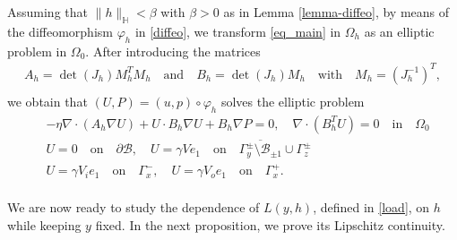 \documentclass[11pt,a4paper]{amsart}
\theoremstyle{remark}
\theoremstyle{definition}
\numberwithin{equation}{section}
\numberwithin{proposition}{section}
\begin{document}
Assuming that $\|h\|_{\mathbb{H}}< \beta$ with $\beta>0$ as in Lemma \ref{lemma-diffeo}, by means of the diffeomorphism $\varphi_h$ in \eqref{diffeo}, we transform \eqref{eq_main} in $\Omega_h$ as an elliptic problem in $\Omega_0$. After
introducing the matrices
\begin{equation}\label{matrices-diffeo}
\begin{aligned}
    A_h= \det(J_h) M_h^TM_h \quad \text{and} \quad B_h= \det(J_h) M_h \quad \text{with} \quad  M_h = (J_h^{-1})^T,\\[5pt]
\end{aligned}
\end{equation}we obtain that $(U,P)=(u, p)\circ \varphi_h$ solves the elliptic problem
\begin{equation}\label{BVprob_trans}
		\begin{aligned}
			&-\eta\nabla \cdot\left( A_h \nabla U \right)  +  U\cdot B_h\nabla U+ B_h\nabla P=0, \quad
			\nabla\cdot (B_h^TU)=0\quad\text{in}\quad \Omega_0\\[2pt]
			&U=0 \quad \text{on} \quad  \partial \mathcal{B} ,\quad U=\gamma Ve_1\quad \text{on} \quad \overline{\Gamma_{y}^\pm \setminus \mathcal{B}_{\pm 1}}\cup\Gamma_z^\pm\\[2pt]
			&U= \gamma V_ie_1\quad \text{on} \quad \Gamma_x^-,\quad U= \gamma V_oe_1\quad\text{on} \quad \Gamma_x^+.\\[5pt]
		\end{aligned}
	\end{equation}

We are now ready to study the dependence of $L(y, h)$, defined in \eqref{load},  on $h$  while keeping $y$ fixed. In the next proposition, we prove its Lipschitz continuity.
\end{document}
